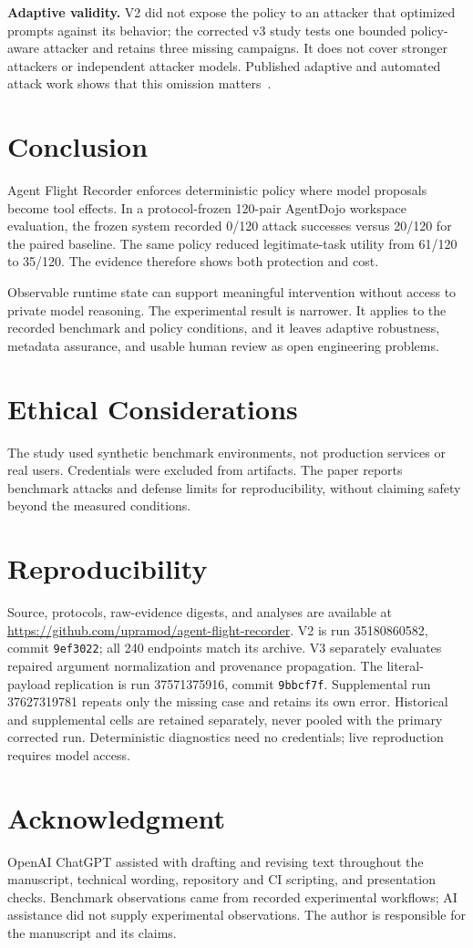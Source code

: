 \documentclass[conference,letterpaper,10pt]{IEEEtran}
\begin{document}
\textbf{Adaptive validity.} V2 did not expose the policy to an attacker that optimized prompts against its behavior; the corrected v3 study tests one bounded policy-aware attacker and retains three missing campaigns. It does not cover stronger attackers or independent attacker models. Published adaptive and automated attack work shows that this omission matters~\cite{zhan2025adaptive,hofer2026automated}.

\section{Conclusion}
Agent Flight Recorder enforces deterministic policy where model proposals become tool effects. In a protocol-frozen 120-pair AgentDojo workspace evaluation, the frozen system recorded 0/120 attack successes versus 20/120 for the paired baseline. The same policy reduced legitimate-task utility from 61/120 to 35/120. The evidence therefore shows both protection and cost.

Observable runtime state can support meaningful intervention without access to private model reasoning. The experimental result is narrower. It applies to the recorded benchmark and policy conditions, and it leaves adaptive robustness, metadata assurance, and usable human review as open engineering problems.

\appendices
\section{Ethical Considerations}
The study used synthetic benchmark environments, not production services or real users. Credentials were excluded from artifacts. The paper reports benchmark attacks and defense limits for reproducibility, without claiming safety beyond the measured conditions.

\section{Reproducibility}
Source, protocols, raw-evidence digests, and analyses are available at \url{https://github.com/upramod/agent-flight-recorder}. V2 is run 35180860582, commit \texttt{9ef3022}; all 240 endpoints match its archive. V3 separately evaluates repaired argument normalization and provenance propagation. The literal-payload replication is run 37571375916, commit \texttt{9bbcf7f}. Supplemental run 37627319781 repeats only the missing case and retains its own error. Historical and supplemental cells are retained separately, never pooled with the primary corrected run. Deterministic diagnostics need no credentials; live reproduction requires model access.

\section*{Acknowledgment}
OpenAI ChatGPT assisted with drafting and revising text throughout the manuscript, technical wording, repository and CI scripting, and presentation checks. Benchmark observations came from recorded experimental workflows; AI assistance did not supply experimental observations. The author is responsible for the manuscript and its claims.



\end{document}
